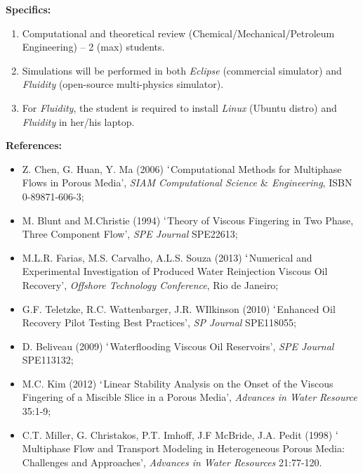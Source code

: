 \documentclass[12pts,a4paper,amsmath,amssymb,floatfix]{article}%
\begin{document}
\begin{enumerate}[label=\bfseries Project \arabic*:]
\noindent
{\bf Specifics:} 
\begin{enumerate}
\item Computational and theoretical review (Chemical/Mechanical/Petroleum Engineering) -- 2 (max) students. 
\item Simulations will be performed in both {\it Eclipse} (commercial simulator) and {\it Fluidity} (open-source multi-physics simulator). 
\item For {\it Fluidity}, the student is required to install {\it Linux} (Ubuntu distro) and {\it Fluidity} in her/his laptop. 
\end{enumerate}


\noindent
{\bf References:}
\begin{itemize}
\item Z. Chen, G. Huan, Y. Ma (2006) $\lq$Computational Methods for Multiphase Flows in Porous Media', {\it SIAM Computational Science $\&$ Engineering}, ISBN 0-89871-606-3;
\item M. Blunt and M.Christie (1994) $\lq$Theory of Viscous Fingering in Two Phase, Three Component Flow', {\it SPE Journal} SPE22613;
\item M.L.R. Farias, M.S. Carvalho, A.L.S. Souza (2013) $\lq$Numerical and Experimental Investigation of Produced Water Reinjection Viscous Oil Recovery', {\it Offshore Technology Conference}, Rio de Janeiro;
\item G.F. Teletzke, R.C. Wattenbarger, J.R. WIlkinson (2010) $\lq$Enhanced Oil Recovery Pilot Testing Best Practices', {\it SP Journal} SPE118055;
\item D. Beliveau (2009) $\lq$Waterflooding Viscous Oil Reservoirs', {\it SPE Journal} SPE113132;
\item M.C. Kim (2012) $\lq$Linear Stability Analysis on the Onset of the Viscous Fingering of a Miscible Slice in a Porous Media', {\it Advances in Water Resource} 35:1-9;%
\item C.T. Miller, G. Christakos, P.T. Imhoff, J.F McBride, J.A. Pedit (1998) $\lq$Multiphase Flow and Transport Modeling in Heterogeneous Porous Media: Challenges and Approaches', {\it Advances in Water Resources} 21:77-120.
\end{itemize}

\clearpage



\end{enumerate}
\end{document}
